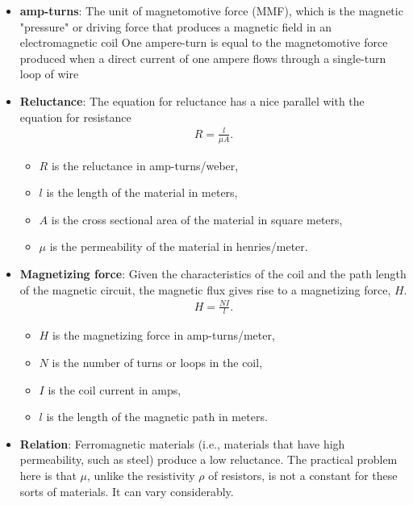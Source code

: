\documentclass{report}
\begin{document}
\begin{itemize}
\begin{itemize}
            \end{itemize}
        \item \textbf{amp-turns}: The unit of magnetomotive force (MMF), which is the magnetic "pressure" or driving force that produces a magnetic field in an electromagnetic coil
            \bigbreak \noindent 
            One ampere-turn is equal to the magnetomotive force produced when a direct current of one ampere flows through a single-turn loop of wire
        \item \textbf{Reluctance}: The equation for reluctance has a nice parallel with the equation for resistance
            \bigbreak \noindent 
            \begin{align*}
                R = \frac{l}{\mu A}
            .\end{align*}
            \begin{itemize}
                \item $R$ is the reluctance in amp-turns/weber,
                \item $l$ is the length of the material in meters,
                \item $A$ is the cross sectional area of the material in square meters,
                \item $\mu$ is the permeability of the material in henries/meter.
            \end{itemize}
        \item \textbf{Magnetizing force}: Given the characteristics of the coil and the path length of the magnetic circuit, the magnetic flux gives rise to a magnetizing force, $H$. 
            \begin{align*}
                H = \frac{NI}{l}
            .\end{align*}
            \begin{itemize}
                \item $H$ is the magnetizing force in amp-turns/meter,
                \item $N$ is the number of turns or loops in the coil,
                \item $I$ is the coil current in amps,
                \item $l$ is the length of the magnetic path in meters.
            \end{itemize}
        \item \textbf{Relation}: Ferromagnetic materials (i.e., materials that have high permeability, such as steel) produce a low reluctance. The practical problem here is that $\mu$, unlike the resistivity $\rho$ of resistors, is not a constant for these sorts of materials. It can vary considerably.

\end{itemize}
\end{document}
